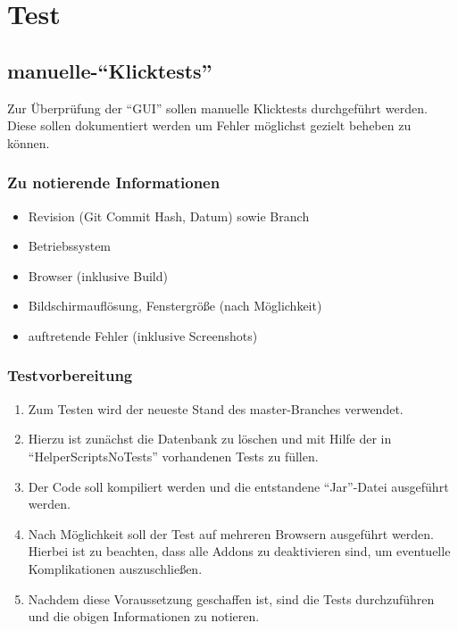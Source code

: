 

\section{Test}
\subsection{manuelle-\enquote{Klicktests}}

Zur Überprüfung der \enquote{GUI} sollen manuelle Klicktests durchgeführt werden.
Diese sollen dokumentiert werden um Fehler möglichst gezielt beheben zu können.\\

\subsubsection*{Zu notierende Informationen}
\begin{itemize}
\item Revision (Git Commit Hash, Datum) sowie Branch
\item Betriebssystem
\item Browser (inklusive Build)
\item Bildschirmauflösung, Fenstergröße (nach Möglichkeit)
\item auftretende Fehler (inklusive Screenshots)
\end{itemize}

\subsubsection*{Testvorbereitung}
\begin{enumerate}
    \item Zum Testen wird der neueste Stand des master-Branches verwendet. 
	\item Hierzu ist zunächst die Datenbank zu löschen und mit Hilfe der in \enquote{HelperScriptsNoTests} 		vorhandenen Tests zu füllen.
	\item Der Code soll kompiliert werden und die entstandene \enquote{Jar}-Datei ausgeführt werden.
    \item Nach Möglichkeit soll der Test auf mehreren Browsern ausgeführt werden. Hierbei ist zu beachten, dass alle Addons zu deaktivieren sind, um eventuelle Komplikationen auszuschließen.
    \item Nachdem diese Voraussetzung geschaffen ist, sind die Tests durchzuführen und die obigen Informationen zu notieren.
\end{enumerate}

